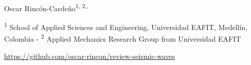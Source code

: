 \documentclass[11pt,twoside]{article}
\begin{document}
\begin{tcolorbox}[colback=white!20,colframe=gray!20,sharp corners]

{\begin{center}
Oscar Rincón-Cardeño\textsuperscript{1, 2,\href{https://orcid.org/0000-0002-5308-9710}{\aiOrcid},
\href{https://github.com/oscar-rincon}{\faGithubSquare}}
\end{center}
}

\vspace{-0.3cm}

{\footnotesize
\textsuperscript{1} School of Applied Sciences and Engineering, Universidad EAFIT, 
Medellín, Colombia - \textsuperscript{2} Applied Mechanics Research Group from Universidad EAFIT
}


{\noindent\footnotesize{\href{https://github.com/oscar-rincon/review-seismic-waves}
{\faGithubSquare \href{https://github.com/oscar-rincon/review-seismic-waves}{ https://github.com/oscar-rincon/review-seismic-waves}}
}
}

\end{tcolorbox}

\end{document}
